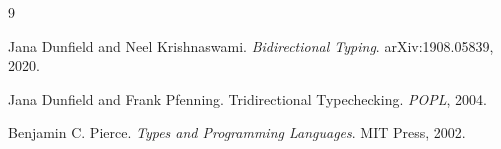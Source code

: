 \documentclass[11pt]{article}
\begin{document}
\begin{thebibliography}{9}

Jana Dunfield and Neel Krishnaswami.
\textit{Bidirectional Typing}.
arXiv:1908.05839, 2020.

Jana Dunfield and Frank Pfenning.
Tridirectional Typechecking.
\textit{POPL}, 2004.

Benjamin C. Pierce.
\textit{Types and Programming Languages}.
MIT Press, 2002.

\end{thebibliography}
\end{document}
